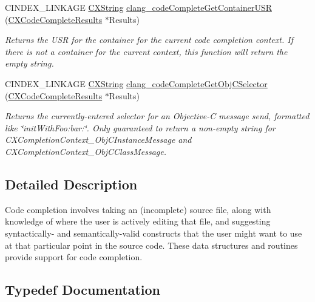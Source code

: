 \begin{DoxyCompactItemize}
C\+I\+N\+D\+E\+X\+\_\+\+L\+I\+N\+K\+A\+GE \mbox{\hyperlink{structCXString}{C\+X\+String}} \mbox{\hyperlink{group__CINDEX__CODE__COMPLET_gaf45d7f61268af6ec88c70a6fc69d5818}{clang\+\_\+code\+Complete\+Get\+Container\+U\+SR}} (\mbox{\hyperlink{structCXCodeCompleteResults}{C\+X\+Code\+Complete\+Results}} $\ast$Results)
\begin{DoxyCompactList}\small\item\em Returns the U\+SR for the container for the current code completion context. If there is not a container for the current context, this function will return the empty string. \end{DoxyCompactList}\item 
C\+I\+N\+D\+E\+X\+\_\+\+L\+I\+N\+K\+A\+GE \mbox{\hyperlink{structCXString}{C\+X\+String}} \mbox{\hyperlink{group__CINDEX__CODE__COMPLET_gad03e82d61a1e6cdb78538bf61823aa11}{clang\+\_\+code\+Complete\+Get\+Obj\+C\+Selector}} (\mbox{\hyperlink{structCXCodeCompleteResults}{C\+X\+Code\+Complete\+Results}} $\ast$Results)
\begin{DoxyCompactList}\small\item\em Returns the currently-\/entered selector for an Objective-\/C message send, formatted like \char`\"{}init\+With\+Foo\+:bar\+:\char`\"{}. Only guaranteed to return a non-\/empty string for C\+X\+Completion\+Context\+\_\+\+Obj\+C\+Instance\+Message and C\+X\+Completion\+Context\+\_\+\+Obj\+C\+Class\+Message. \end{DoxyCompactList}\end{DoxyCompactItemize}


\subsection{Detailed Description}
Code completion involves taking an (incomplete) source file, along with knowledge of where the user is actively editing that file, and suggesting syntactically-\/ and semantically-\/valid constructs that the user might want to use at that particular point in the source code. These data structures and routines provide support for code completion. 

\subsection{Typedef Documentation}
\mbox{\label{group__CINDEX__CODE__COMPLET_gafea23a43a60ec3b4f3bedccfbb76883a}} 
